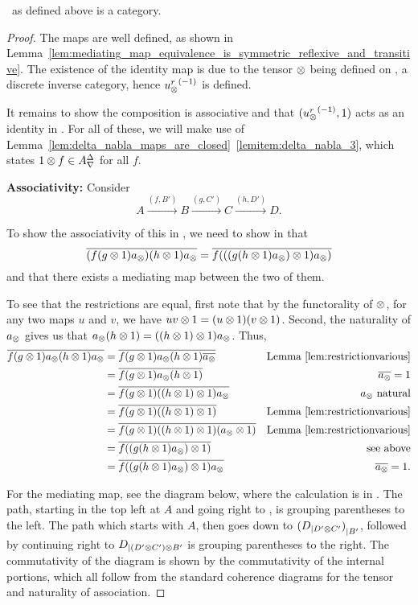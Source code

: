 \begin{lemma}\label{lem:xt_is_a_category}
  \Xt\ as defined above is a category.
\end{lemma}
\begin{proof}
  The maps are well defined, as shown in
  Lemma~\ref{lem:mediating_map_equivalence_is_symmetric_reflexive_and_transitive}. The existence of
  the identity map is due to the tensor $\otimes$ being defined on \X, a discrete inverse category, hence
  ${u_{\otimes}^r}^{(-1)}$ is defined.

  It remains to show the composition is associative and that $({u_{\otimes}^r}^{(-1)}, 1)$ acts as an identity
  in \Xt. For all of these, we will make use of
  Lemma~\ref{lem:delta_nabla_maps_are_closed}~\ref{lemitem:delta_nabla_3},  which states $1\otimes f \in
  {A}^{\Delta}_{\nabla}$ for all $f$.

  \textbf{Associativity:}
  Consider
  \[
    A\xrightarrow{(f,B')}B\xrightarrow{(g,C')} C \xrightarrow{(h,D')}D.
  \]

  To show the associativity of this in \Xt, we need to show in \X that
  \[
    \overline{(f(g\otimes1)a_{\otimes}) (h\otimes1)a_{\otimes}} = \overline{f (((g(h\otimes1)a_{\otimes})\otimes1) a_{\otimes})}
  \]
  and that there exists a mediating map between the two of them.

  To see that the restrictions are equal, first note that by the functorality of $\otimes$, for any two
  maps $u$ and $v$, we have $u v \otimes 1 = (u\otimes1) (v\otimes1)$. Second, the naturality of $a_{\otimes}$ gives us
  that $a_{\otimes} (h \otimes 1) = ((h\otimes1)\otimes1) a_{\otimes}$. Thus,
  \begin{align*}
    \overline{f(g\otimes1)a_{\otimes} (h\otimes1)a_{\otimes}}
      & = \overline{f(g\otimes1)a_{\otimes} (h\otimes1)\overline{a_{\otimes}}}
    & \text{Lemma \ref{lem:restrictionvarious}} \\
    & = \overline{f(g\otimes1)a_{\otimes} (h\otimes1)} & \overline{a_{\otimes}}=1 \\
    & = \overline{f(g\otimes1) ((h\otimes1)\otimes1) a_{\otimes} } & a_{\otimes}\text{ natural} \\
    & = \overline{f(g\otimes1) ((h\otimes1)\otimes1) }
      &  \text{Lemma \ref{lem:restrictionvarious}}\\
    & = \overline{f(g\otimes1) ((h\otimes1)\otimes1) (a_{\otimes}\otimes1)}
      & \text{Lemma \ref{lem:restrictionvarious}}\\
    & = \overline{f((g (h\otimes1)a_{\otimes} )\otimes1)} & \text{ see above}\\
    & = \overline{f((g (h\otimes1)a_{\otimes} )\otimes1)a_{\otimes}} & \overline{a_{\otimes}}=1 .
  \end{align*}

  For the mediating map, see the diagram below, where the calculation is in \X. The path, starting in
  the top left at $A$ and going right to , is grouping parentheses to the
  left. The path which starts with $A$, then goes down to ${({D}_{|{D' \otimes C'}})}_{|{B'}}$,
  followed by continuing right to $ {D}_{|{(D' \otimes C') \otimes B'}}$ is grouping parentheses to the
  right. The commutativity of the diagram is shown by the commutativity of the internal portions,
  which all follow from the standard coherence diagrams for the tensor and naturality of
  association.


\end{proof}
